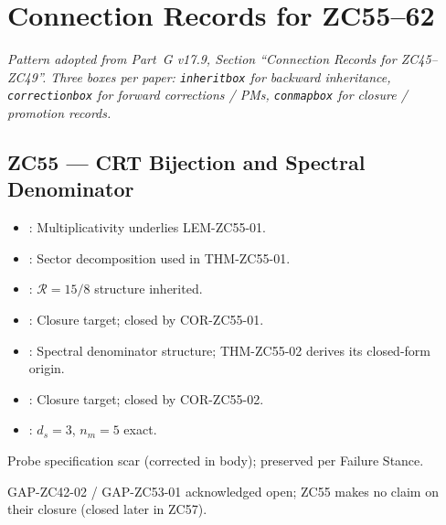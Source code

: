 \documentclass[12pt, a4paper]{article}
\begin{document}
\section{Connection Records for ZC55--62}
\label{sec:xlii-records}

\noindent
\textit{Pattern adopted from Part~G v17.9, Section ``Connection Records
for ZC45--ZC49''. Three boxes per paper: \texttt{inheritbox} for
backward inheritance, \texttt{correctionbox} for forward corrections /
PMs, \texttt{conmapbox} for closure / promotion records.}

\subsection{ZC55 --- CRT Bijection and Spectral Denominator}

\begin{inheritbox}[title={ZC55 Backward Inheritance}]
\begin{itemize}[leftmargin=1.5em]
\item {}:
  Multiplicativity underlies LEM-ZC55-01.
\item {}: Sector
  decomposition used in THM-ZC55-01.
\item {}:
  $\mathcal{R}=15/8$ structure inherited.
\item {}: Closure target;
  closed by COR-ZC55-01.
\item {}: Spectral
  denominator structure; THM-ZC55-02 derives its closed-form origin.
\item {}: Closure
  target; closed by COR-ZC55-02.
\item {}: $d_s=3$, $n_m=5$ exact.
\end{itemize}
\end{inheritbox}

\begin{correctionbox}[title={ZC55 Forward Corrections / PMs}]
\begin{description}[leftmargin=1.5em]
\item[\pmdiamond{ZC55-01}] Probe specification scar (corrected in body);
  preserved per Failure Stance.
\item[Inherited:] GAP-ZC42-02 / GAP-ZC53-01 acknowledged open;
  ZC55 makes no claim on their closure (closed later in ZC57).
\end{description}
\end{correctionbox}
\end{document}
